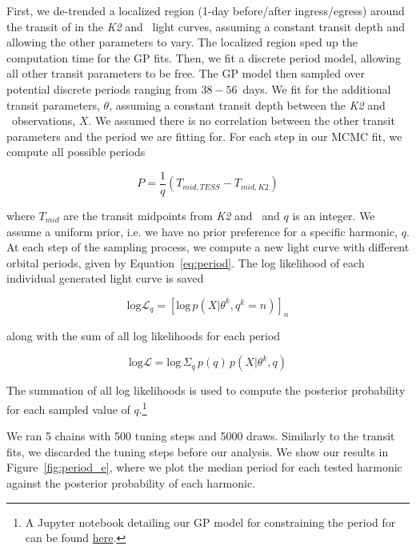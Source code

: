 \documentclass[twocolumn]{aastex631}
\begin{document}
First, we de-trended a localized region (1-day before/after ingress/egress) around the transit of \planete in the \textit{K2} and \tess\ light curves, assuming a constant transit depth and allowing the other parameters to vary. The localized region sped up the computation time for the GP fits. Then, we fit a discrete period model, allowing all other transit parameters to be free. The GP model then sampled over potential discrete periods ranging from $38 - 56$~days. We fit for the additional transit parameters, $\theta$, assuming a constant transit depth between the \textit{K2} and \tess\ observations, $X$. We assumed there is no correlation between the other transit parameters and the period we are fitting for. For each step in our MCMC fit, we compute all possible periods

\begin{equation}\label{eq:period}
    P = \frac{1}{q} \left(T_{mid,TESS} - T_{mid, K2}\right)
\end{equation}

where $T_{mid}$ are the transit midpoints from \textit{K2} and \tess\ and $q$ is an integer. We assume a uniform prior, i.e. we have no prior preference for a specific harmonic, $q$. At each step of the sampling process, we compute a new light curve with different orbital periods, given by Equation~\ref{eq:period}. The log likelihood of each individual generated light curve is saved

\begin{equation}
    \textrm{log} \mathcal{L}_q = \left[ \textrm{log}\, p \left( X | \theta^k, q^k = n \right) \right]_n
\end{equation}

along with the sum of all log likelihoods for each period 

\begin{equation}
    \textrm{log} \mathcal{L} = \textrm{log}\, \Sigma_q\, p(q)\, p(X|\theta^k, q) 
\end{equation}

The summation of all log likelihoods is used to compute the posterior probability for each sampled value of $q$.\footnote{A Jupyter notebook detailing our GP model for constraining the period for \planete can be found \href{https:\/\/github.com\/afeinstein20\/v1298tau\_tess\/notebooks\/planet\_e.ipynb}{here}.}

We ran 5 chains with 500 tuning steps and 5000 draws. Similarly to the transit fits, we discarded the tuning steps before our analysis. We show our results in Figure~\ref{fig:period_e}, where we plot the median period for each tested harmonic against the posterior probability of each harmonic.
\end{document}

